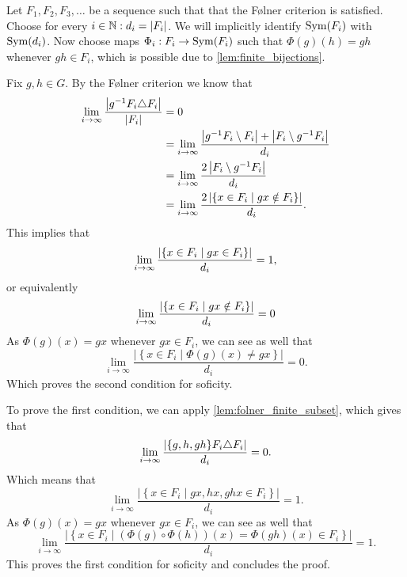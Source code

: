 Let $F_1, F_2, F_3, \dots $ be a sequence such that that the Følner criterion is satisfied.
Choose for every $i \in \mathbb{N}: d_i = |F_i|$. We will implicitly identify $\operatorname{Sym}(F_i)$ with $\operatorname{Sym}(d_i)$. Now choose maps $\Phi_i: F_i \to \operatorname{Sym}(F_i)$ such that $\Phi(g)(h) = gh$ whenever $gh \in F_i$, which is possible due to \cref{lem:finite_bijections}. 

Fix $g, h \in G$. By the Følner criterion we know that 
\begin{align*}
    \lim_{i\to \infty} \frac{\left| g^{-1}F_i \triangle F_i \right|}{\left| F_i \right|} &= 0\\
    &= \lim_{i\to \infty} \frac{\left| g^{-1}F_i \setminus F_i \right| + \left| F_i \setminus g^{-1}F_i \right|}{d_i}\\
    &= \lim_{i\to \infty} \frac{2\left|  F_i \setminus g^{-1}F_i  \right|}{d_i}\\
    &= \lim_{i\to \infty} \frac{2\left| \left\{ x \in F_i \mid gx \notin F_i \right\} \right|}{d_i}. 
\end{align*}
This implies that \begin{equation}
    \lim_{i\to \infty} \frac{\left| \left\{ x \in F_i \mid gx \in F_i \right\} \right|}{d_i} = 1,
\end{equation}
or equivalently 
\begin{equation}\label{eq:proof_folner1}
    \lim_{i\to \infty} \frac{\left| \left\{ x \in F_i \mid gx \notin F_i \right\} \right|}{d_i} = 0
\end{equation}
As $\Phi(g)(x) = gx$ whenever $gx \in F_i$, we can see as well that 
$$\lim_{i\to \infty} \frac{\left|\left\{ x \in F_i \mid \Phi(g)(x)\ne gx \right\}\right|}{d_i} = 0.$$
Which proves the second condition for soficity. 

To prove the first condition, we can apply \cref{lem:folner_finite_subset}, which gives that \[
	\lim_{i \to \infty} \frac{\left| \{g,h, gh\} F_i \triangle F_i \right|}{d_i} = 0
.\]
Which means that 
$$\lim_{i\to \infty} \frac{\left|\left\{ x \in F_i \mid gx,hx,ghx \in F_i \right\}\right|}{d_i}= 1.$$
As $\Phi(g)(x) = gx$ whenever $gx \in F_i$, we can see as well that
$$\lim_{i\to \infty} \frac{\left|\left\{ x \in F_i \mid (\Phi(g) \circ\Phi(h))(x) = \Phi(gh)(x) \in F_i \right\}\right|}{d_i}= 1.$$
This proves the first condition for soficity and concludes the proof. 
